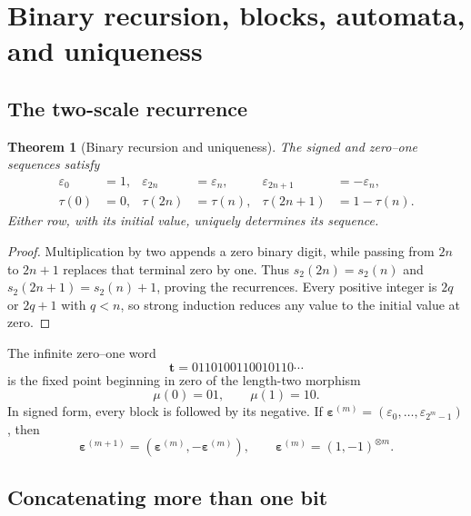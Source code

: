 \documentclass[11pt,oneside]{article}
\newtheorem{theorem}{Theorem}[section]
\theoremstyle{definition}
\theoremstyle{remark}
\newcommand{\wt}{s_2}
\newcommand{\eps}{\varepsilon}
\begin{document}
\section{Binary recursion, blocks, automata, and uniqueness}
\label{sec:binary}

\subsection{The two-scale recurrence}

\begin{theorem}[Binary recursion and uniqueness]
\label{thm:binary-recursion}
The signed and zero--one sequences satisfy
\begin{align}
  \eps_0&=1,& \eps_{2n}&=\eps_n,& \eps_{2n+1}&=-\eps_n,     \label{eq:eps-recursion}\\
  \tau(0)&=0,& \tau(2n)&=\tau(n),& \tau(2n+1)&=1-\tau(n).  \label{eq:tau-recursion}
\end{align}
Either row, with its initial value, uniquely determines its sequence.
\end{theorem}

\begin{proof}
Multiplication by two appends a zero binary digit, while passing from \(2n\) to \(2n+1\)
replaces that terminal zero by one.  Thus
\(\wt(2n)=\wt(n)\) and \(\wt(2n+1)=\wt(n)+1\), proving the recurrences.
Every positive integer is \(2q\) or \(2q+1\) with \(q<n\), so strong induction reduces any
value to the initial value at zero.
\end{proof}

The infinite zero--one word
\[
  \mathbf t=0110100110010110\cdots
\]
is the fixed point beginning in zero of the length-two morphism
\begin{equation}
  \mu(0)=01,
  \qquad
  \mu(1)=10.                                                \label{eq:TM-morphism}
\end{equation}
In signed form, every block is followed by its negative.  If
\(\bm\eps^{(m)}=(\eps_0,\ldots,\eps_{2^m-1})\), then
\begin{equation}
  \bm\eps^{(m+1)}=(\bm\eps^{(m)},-\bm\eps^{(m)}),
  \qquad
  \bm\eps^{(m)}=(1,-1)^{\otimes m}.                         \label{eq:tensor-block}
\end{equation}

\subsection{Concatenating more than one bit}
\end{document}
